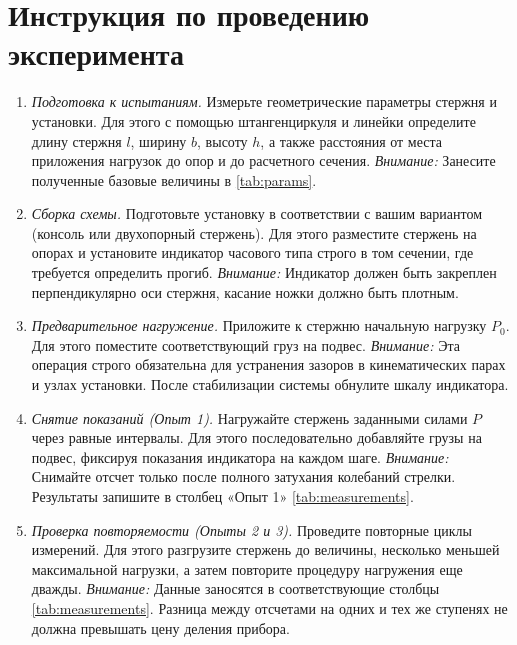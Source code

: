 \section*{Инструкция по проведению эксперимента}
\begin{enumerate}
    \item \textit{Подготовка к испытаниям.}
    Измерьте геометрические параметры стержня и установки.
    Для этого с помощью штангенциркуля и линейки определите длину стержня $l$, ширину $b$, высоту $h$, а также расстояния от места приложения нагрузок до опор и до расчетного сечения.
    \textit{Внимание:} Занесите полученные базовые величины в \cref{tab:params}.

    \item \textit{Сборка схемы.}
    Подготовьте установку в соответствии с вашим вариантом (консоль или двухопорный стержень).
    Для этого разместите стержень на опорах и установите индикатор часового типа строго в том сечении, где требуется определить прогиб.
    \textit{Внимание:} Индикатор должен быть закреплен перпендикулярно оси стержня, касание ножки должно быть плотным.

    \item \textit{Предварительное нагружение.}
    Приложите к стержню начальную нагрузку $P_0$.
    Для этого поместите соответствующий груз на подвес.
    \textit{Внимание:} Эта операция строго обязательна для устранения зазоров в кинематических парах и узлах установки. После стабилизации системы обнулите шкалу индикатора.

    \item \textit{Снятие показаний (Опыт 1).}
    Нагружайте стержень заданными силами $P$ через равные интервалы.
    Для этого последовательно добавляйте грузы на подвес, фиксируя показания индикатора на каждом шаге.
    \textit{Внимание:} Снимайте отсчет только после полного затухания колебаний стрелки. Результаты запишите в столбец «Опыт 1» \cref{tab:measurements}.

    \item \textit{Проверка повторяемости (Опыты 2 и 3).}
    Проведите повторные циклы измерений.
    Для этого разгрузите стержень до величины, несколько меньшей максимальной нагрузки, а затем повторите процедуру нагружения еще дважды.
    \textit{Внимание:} Данные заносятся в соответствующие столбцы \cref{tab:measurements}. Разница между отсчетами на одних и тех же ступенях не должна превышать цену деления прибора.
\end{enumerate}

